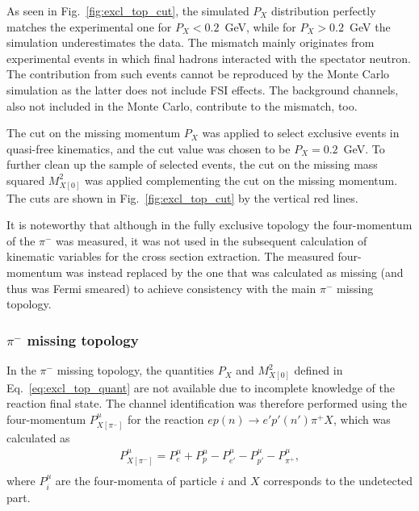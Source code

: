 \documentclass[prc,twocolumn,superscriptaddress,showpacs,amssymb,amsmath,amsfonts,aps,nofootinbib]{revtex4-1}
\begin{document}
As seen in Fig.\!~\ref{fig:excl_top_cut}, the simulated $P_{X}$ distribution perfectly matches the experimental one for $P_{X} < 0.2$~GeV, while for $P_{X} > 0.2$~GeV the simulation underestimates the data. The mismatch mainly originates from experimental events in which final hadrons interacted with the spectator neutron. The contribution from such events cannot be reproduced by the Monte Carlo simulation as the latter does not include FSI effects. The background channels, also not included in the Monte Carlo, contribute to the mismatch, too. %


The cut on the missing momentum $P_{X}$ was applied to select exclusive events in quasi-free kinematics, and the cut value was chosen to be $P_{X} = 0.2$~GeV. To further clean up the sample of selected events, the cut on the missing mass squared $M^{2}_{X[0]}$ was applied complementing the cut on the missing momentum. The cuts are shown in Fig.\!~\ref{fig:excl_top_cut} by the vertical red lines.


It is noteworthy that although in the fully exclusive topology the four-momentum of the $\pi^{-}$ was measured, it was not used in the subsequent calculation of kinematic variables for the cross section extraction. The measured four-momentum was instead replaced by the one that was calculated as missing (and thus was Fermi smeared) to achieve consistency with the main $\pi^{-}$ missing topology.

\subsubsection{$\pi^{-}$ missing topology}
\label{Sect:excl_cut_pim_miss}


In the $\pi^{-}$ missing topology, the quantities $P_{X}$ and $M^{2}_{X[0]}$ defined in Eq.\!~\eqref{eq:excl_top_quant} are not available due to incomplete knowledge of the reaction final state. The channel identification was therefore performed using the four-momentum $P_{X[\pi^{-}]}^{\mu}$ for the reaction $ep(n)\rightarrow e'p'(n')\pi^{+}X$, which was calculated as
\begin{equation}
\begin{aligned}
P_{X[\pi^{-}]}^{\mu}=P_{e}^{\mu} + P_{p}^{\mu}- P_{e'}^{\mu}- P_{p'}^{\mu}-  P_{\pi^{+}}^{\mu},\\[-2pt]
\end{aligned}\label{eq:pimmiss_top_quant}
\end{equation}%
where $P_{i}^{\mu}$ are the four-momenta of particle $i$ and $X$ corresponds to the undetected part.
\end{document}
